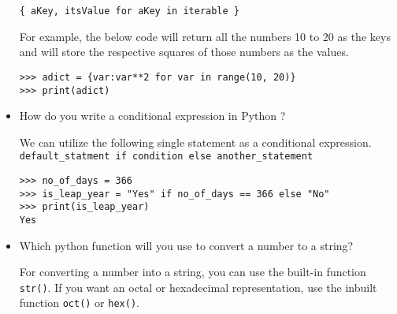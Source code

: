 \documentclass[11pt]{article}
\begin{document}
\begin{itemize}
\verb;{ aKey, itsValue for aKey in iterable };

For example, the below code will return all the numbers 10 to 20 as the keys and will store the respective squares of those numbers as the values.

\begin{verbatim}
>>> adict = {var:var**2 for var in range(10, 20)}
>>> print(adict)
\end{verbatim}

\item How do you write a conditional expression in Python ?
  
  We can utilize the following single statement as a conditional expression.
  \verb;default_statment if condition else another_statement;

\begin{verbatim}
>>> no_of_days = 366
>>> is_leap_year = "Yes" if no_of_days == 366 else "No"
>>> print(is_leap_year)
Yes
\end{verbatim}

\item Which python function will you use to convert a number to a string?
  
  For converting a number into a string, you can use the built-in function \verb;str();.  If you want an octal or hexadecimal representation, use the inbuilt function \verb;oct(); or \verb;hex();.
\end{itemize}
    
    
    
\end{document}
